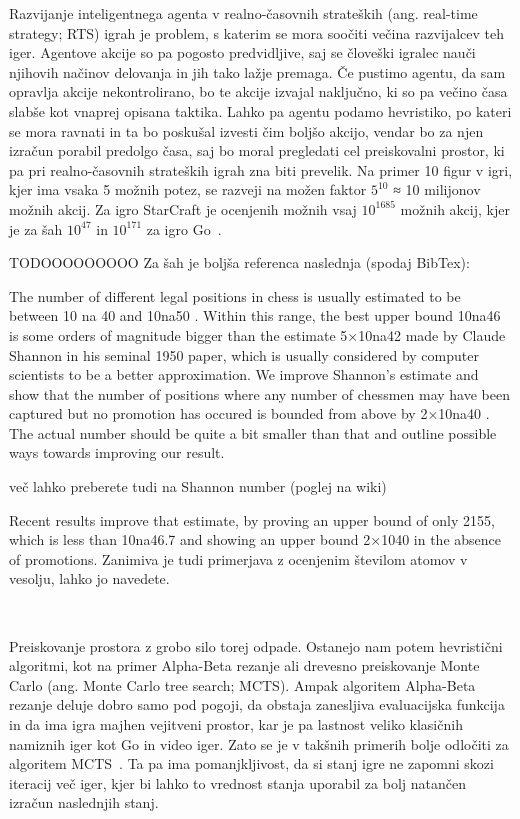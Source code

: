 \documentclass[a4paper, 12pt]{book}
\begin{document}
Razvijanje inteligentnega agenta v realno-časovnih strateških (ang. real-time strategy; RTS) igrah je problem, s katerim se mora soočiti večina razvijalcev teh iger. Agentove akcije so pa pogosto predvidljive, saj se človeški igralec nauči njihovih načinov delovanja in jih tako lažje premaga.
Če pustimo agentu, da sam opravlja akcije nekontrolirano, bo te akcije izvajal naključno, ki so pa večino časa slabše kot vnaprej opisana taktika.
Lahko pa agentu podamo hevristiko, po kateri se mora ravnati in ta bo poskušal izvesti čim boljšo akcijo, vendar bo za njen izračun porabil predolgo časa, saj bo moral pregledati cel preiskovalni prostor, ki pa pri realno-časovnih strateških igrah zna biti prevelik.
Na primer 10 figur v igri, kjer ima vsaka 5 možnih potez, se razveji na možen faktor $5^{10}$ ≈ 10 milijonov možnih akcij.
Za igro StarCraft je ocenjenih možnih vsaj $10^{1685}$ možnih akcij, kjer je za šah $10^{47}$ in $10^{171}$ za igro Go~\cite{ontanon2017combinatorial}.



TODOOOOOOOOO
Za šah je boljša referenca naslednja (spodaj BibTex):


The number of different legal positions in chess is usually estimated to be between   10 na 40  and   10na50 . Within this range, the best upper bound   10na46  is some orders of magnitude bigger than the estimate   5×10na42  made by Claude Shannon in his seminal 1950 paper, which is usually considered by computer scientists to be a better approximation. We improve Shannon’s estimate and show that the number of positions where any number of chessmen may have been captured but no promotion has occured is bounded from above by   2×10na40 . The actual number should be quite a bit smaller than that and outline possible ways towards improving our result.

več lahko preberete tudi na  Shannon number (poglej na wiki)

Recent results improve that estimate, by proving an upper bound of only 2155, which is less than 10na46.7 and showing an upper bound 2×1040 in the absence of promotions.
Zanimiva je tudi primerjava z ocenjenim številom atomov v vesolju, lahko jo navedete.


~\cite{steinerberger2015number}













Preiskovanje prostora z grobo silo torej odpade. 
Ostanejo nam potem hevristični algoritmi, kot na primer Alpha-Beta rezanje ali drevesno preiskovanje Monte Carlo (ang. Monte Carlo tree search; MCTS). 
Ampak algoritem Alpha-Beta rezanje deluje dobro samo pod pogoji, da obstaja zanesljiva evaluacijska funkcija in da ima igra majhen vejitveni prostor, kar je pa lastnost veliko klasičnih namiznih iger kot Go in video iger. 
Zato se je v takšnih primerih bolje odločiti za algoritem MCTS~\cite{chaslot2008monte}.
Ta pa ima pomanjkljivost, da si stanj igre ne zapomni skozi iteracij več iger, kjer bi lahko to vrednost stanja uporabil za bolj natančen izračun naslednjih stanj.
\end{document}

